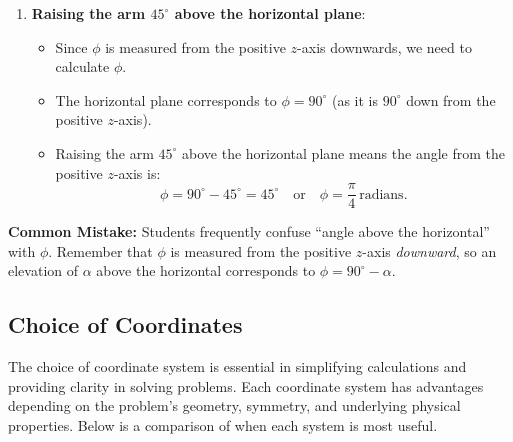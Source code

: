 \begin{example}
\begin{solution}
\begin{enumerate}
    \item \textbf{Raising the arm \( 45^\circ \) above the horizontal plane}:
        \begin{itemize}
            \item Since \( \phi \) is measured from the positive \( z \)-axis downwards, we need to calculate \( \phi \).
            \item The horizontal plane corresponds to \( \phi = 90^\circ \) (as it is \( 90^\circ \) down from the positive \( z \)-axis).
            \item Raising the arm \( 45^\circ \) above the horizontal plane means the angle from the positive \( z \)-axis is:
            \[
            \phi = 90^\circ - 45^\circ = 45^\circ \quad \text{or} \quad \phi = \dfrac{\pi}{4} \, \text{radians}.
            \]
        \end{itemize}
\end{enumerate}

\end{solution}
\end{example}

\noindent \textbf{Common Mistake:} Students frequently confuse ``angle above the horizontal'' with \( \phi \). Remember that \( \phi \) is measured from the positive \( z \)-axis \textit{downward}, so an elevation of \( \alpha \) above the horizontal corresponds to \( \phi = 90^\circ - \alpha \).

\exampleline

\subsection*{Choice of Coordinates}

The choice of coordinate system is essential in simplifying calculations and providing clarity in solving problems. Each coordinate system has advantages depending on the problem's geometry, symmetry, and underlying physical properties. Below is a comparison of when each system is most useful.

